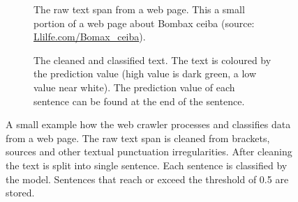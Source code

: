 \documentclass[a4paper, 12pt, oneside]{book} %
\begin{document}
\begin{figure} [h!]
     \centering
     \begin{subfigure}[b]{1.00\textwidth}
         \centering
         \caption[Raw text span example]{The raw text span from a web page. This a small portion of a web page about Bombax ceiba (source: \href{http://www.llifle.com/Encyclopedia/TREES/Family/Bombacaceae/31994/Bombax_ceiba}{Llilfe.com/Bomax\_ceiba}).}
         \label{fig:webcrawler_sents_nopred}
     \end{subfigure}
     \vfill
     \begin{subfigure}[b]{1.00\textwidth}
         \centering
         \caption[Cleaned and classified text span example]{The cleaned and classified text. The text is coloured by the prediction value (high value is dark green, a low value near white). The prediction value of each sentence can be found at the end of the sentence.}
         \label{fig:webcrawler_sents_pred}
     \end{subfigure}
     \caption[Example of the web crawler process]{A small example how the web crawler processes and classifies data from a web page. The raw text span is cleaned from brackets, sources and other textual punctuation irregularities. After cleaning the text is split into single sentence. Each sentence is classified by the model. Sentences that reach or exceed the threshold of 0.5 are stored.}
     \label{fig:webcrawler_sents}
\end{figure}
\end{document}

